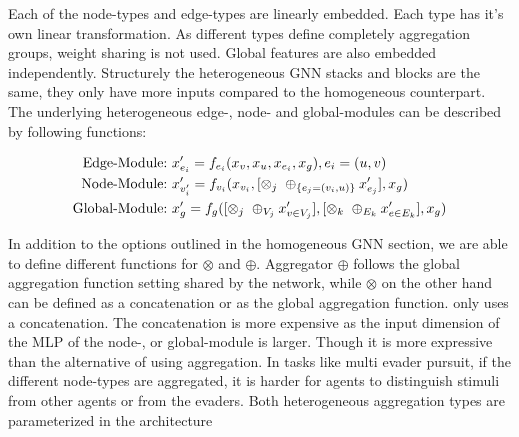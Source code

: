 Each of the node-types and edge-types are linearly embedded. Each type has it's own linear transformation. As different types define completely aggregation groups, weight sharing is not used. Global features are also embedded independently. Structurely the heterogeneous GNN stacks and blocks are the same, they only have more inputs compared to the homogeneous counterpart. The underlying heterogeneous edge-, node- and global-modules can be described by following functions:

\begin{equation}
    \begin{aligned}
        \textup{Edge-Module:}\ & x'_{e_i} = f_{e_i}(x_v, x_u, x_{e_i}, x_g), e_i = (u, v)\\
        \textup{Node-Module:}\ & x'_{v'_i} = f_{v_i}(x_{v_i}, [\otimes_j\ \oplus_{\{e_j=(v_i,u)\}} x'_{e_j}], x_g)\\
        \textup{Global-Module:}\ & x'_{g} = f_g([\otimes_j\ \oplus_{V_j} x'_{v\in V_j}], [\otimes_k\ \oplus_{E_k} x'_{e\in E_k}], x_g)
    \end{aligned}
    \nonumber
\end{equation}

In addition to the options outlined in the homogeneous GNN section, we are able to define different functions for $\otimes$ and $\oplus$. Aggregator $\oplus$ follows the global aggregation function setting shared by the network, while $\otimes$ on the other hand can be defined as a concatenation or as the global aggregation function.  only uses a concatenation. The concatenation is more expensive as the input dimension of the MLP of the node-, or global-module is larger. Though it is more expressive than the alternative of using aggregation. In tasks like multi evader pursuit, if the different node-types are aggregated, it is harder for agents to distinguish stimuli from other agents or from the evaders. Both heterogeneous aggregation types are parameterized in the architecture

